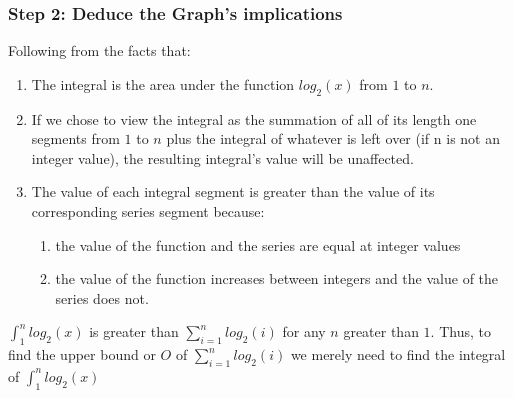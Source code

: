 \documentclass[10pt,a4paper]{article}
\theoremstyle{definition}
\begin{document}
\subsubsection{Step 2: Deduce the Graph's implications}
Following from the facts that:
\begin{enumerate}
  \item The integral is the area under the function $log_2(x)$ from $1$ to $n$.
  \item If we chose to view the integral as the summation of all of its length one segments from $1$ to $n$ plus the integral of whatever is left over (if n is not an integer value), the resulting integral's value will be unaffected.
  \item The value of each integral segment is greater than the value of its corresponding series segment because:
  \begin{enumerate}
    \item the value of the function and the series are equal at integer values
    \item the value of the function increases between integers and the value of the series does not.
  \end{enumerate}
\end{enumerate}
$\int_1^n log_2(x)$ is greater than $\sum_{i = 1}^n log_2(i)$ for any $n$ greater than $1$. Thus, to find the upper bound or $O$ of $\sum_{i = 1}^n log_2(i)$ we merely need to find the integral of $\int_1^n log_2(x)$\\\\
\end{document}
